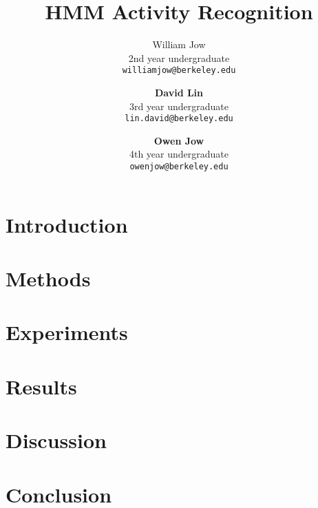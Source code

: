 \documentclass{article}
\title{HMM Activity Recognition}
\author{
  William Jow \\
  2nd year undergraduate \\
  \texttt{williamjow@berkeley.edu}
  \and
  \textbf{David Lin} \\
  3rd year undergraduate \\
  \texttt{lin.david@berkeley.edu}
  \and
  \textbf{Owen Jow} \\
  4th year undergraduate \\
  \texttt{owenjow@berkeley.edu}
}
\begin{document}
\maketitle

\begin{abstract}


\end{abstract}

\section{Introduction}

\cite{kd2016}

\section{Methods}


\section{Experiments}


\section{Results}


\section{Discussion}


\section{Conclusion}




\end{document}
